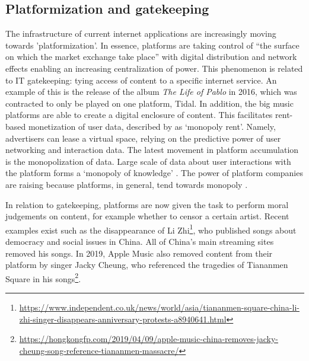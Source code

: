 \subsection{Platformization and gatekeeping}
The infrastructure of current internet applications are increasingly moving towards 'platformization'. In essence, platforms are taking control of ``the surface on which the market exchange take place'' \citep{andersson2016mastering} with digital distribution and network effects enabling an increasing centralization of power. This phenomenon is related to IT gatekeeping: tying access of content to a specific internet service. An example of this is the release of the album \textit{The Life of Pablo} in 2016, which was contracted to only be played on one platform, Tidal. In addition, the big music platforms are able to create a digital enclosure of content. This facilitates rent-based monetization of user data, described by \citep{harvey2002art} as `monopoly rent'. Namely, advertisers can lease a virtual space, relying on the predictive power of user networking and interaction data. The latest movement in platform accumulation is the monopolization of data. Large scale of data about user interactions with the platform forms a `monopoly of knowledge' \citep{innis2007empire}. The power of platform companies are raising because platforms, in general, tend towards monopoly \citep{srnicek2017platform}. 

In relation to gatekeeping, platforms are now given the task to perform moral judgements on content, for example whether to censor a certain artist. Recent examples exist such as the disappearance of Li Zhi\footnote{\url{https://www.independent.co.uk/news/world/asia/tiananmen-square-china-li-zhi-singer-disappears-anniversary-protests-a8940641.html}}, who published songs about democracy and social issues in China. All of China's main streaming sites removed his songs. In 2019, Apple Music also removed content from their platform by singer Jacky Cheung, who referenced the tragedies of Tiananmen Square in his songs\footnote{\url{https://hongkongfp.com/2019/04/09/apple-music-china-removes-jacky-cheung-song-reference-tiananmen-massacre/}}.

